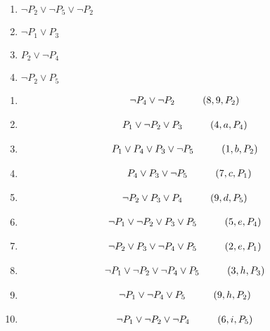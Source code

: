 \documentclass[a4paper,12pt]{article}
\newcommand\tab[1][1cm]{\hspace*{#1}}
\begin{document}
\begin{enumerate}
\begin{multicols}{3}
\begin{enumerate}[(1)]
			\item $\neg P_2 \lor  \neg P_5 \lor  \neg P_2$
			\item $\neg P_1 \lor  P_3$
			\item $P_2 \lor  \neg P_4$
			\item $\neg P_2 \lor P_5$
		\end{enumerate}
	\end{multicols}
	\begin{multicols}{2}
		\begin{enumerate}
			\item \begin{align*}
				\neg P_4\lor\neg P_2\tab & (8,9,P_2)
			\end{align*}
			\item \begin{align*}
				P_1\lor\neg P_2\lor P_3\tab & (4,a,P_4)
			\end{align*}
			\item \begin{align*}
				P_1\lor P_4\lor P_3\lor\neg P_5\tab & (1,b,P_2) 
			\end{align*}		 
			\item \begin{align*}
				P_4\lor P_3\lor\neg P_5\tab (7,c,P_1)
			\end{align*}
			\item \begin{align*}
				\neg P_2 \lor P_3\lor P_4\tab & (9, d, P_5)
			\end{align*}
			\item \begin{align*}
				\neg P_1\lor\neg P_2\lor P_3\lor P_5\tab & (5,e,P_4)
			\end{align*}
			\item \begin{align*}
				\neg P_2\lor P_3\lor\neg P_4\lor P_5\tab & (2,e,P_1)
			\end{align*}
			\item \begin{align*}
				\neg P_1\lor\neg P_2\lor \neg P_4\lor P_5\tab & (3,h,P_3)
			\end{align*}
			\item \begin{align*}
				\neg P_1\lor\neg P_4\lor P_5\tab & (9,h,P_2)
			\end{align*}
			\item \begin{align*}
				\neg P_1\lor\neg P_2\lor\neg P_4\tab & (6,i,P_5) 
			\end{align*}

\end{enumerate}
\end{multicols}
\end{enumerate}
\end{document}
